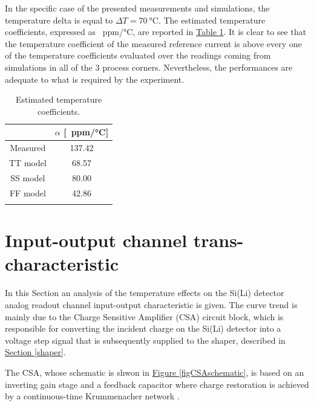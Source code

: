 \noindent
In the specific case of the presented measurements and simulations, the temperature delta is equal to $\Delta T = \SI{70}{\celsius}$. The estimated temperature coefficients, expressed as \SI{}{ppm/\celsius}, are reported in \hyperref[tabtempcoefficients]{Table \ref{tabtempcoefficients}}. It is clear to see that the temperature coefficient of the measured reference current is above every one of the temperature coefficients evaluated over the readings coming from simulations in all of the 3 process corners. Nevertheless, the performances are adequate to what is required by the experiment.

\begin{table}[ht]
    \centering
    \begin{tabular}{c c} 
        \Xhline{2\arrayrulewidth}
        & $\alpha$ [\SI{}{ppm/\celsius}] \T\B \\
        \hline
        Measured & 137.42 \T\B \\
        TT model & 68.57 \T\B \\
        SS model & 80.00 \T\B \\
        FF model & 42.86 \T\B \\
        \Xhline{2\arrayrulewidth}
    \end{tabular}
    \caption{Estimated temperature coefficients.}
    \label{tabtempcoefficients}
\end{table}



\section{Input-output channel trans-characteristic}
\label{testboardFDT}

In this Section an analysis of the temperature effects on the Si(Li) detector analog readout channel input-output characteristic is given. The curve trend is mainly due to the Charge Sensitive Amplifier (CSA) circuit block, which is responsible for converting the incident charge on the Si(Li) detector into a voltage step signal that is subsequently supplied to the shaper, described in \hyperref[shaper]{Section \ref{shaper}}. 

\par
The CSA, whose schematic is shwon in \hyperref[figCSAschematic]{Figure \ref{figCSAschematic}}, is based on an inverting gain stage and a feedback capacitor where charge restoration is achieved by a continuous-time Krummenacher network \cite{krummenacher_1991_pixel}. 

